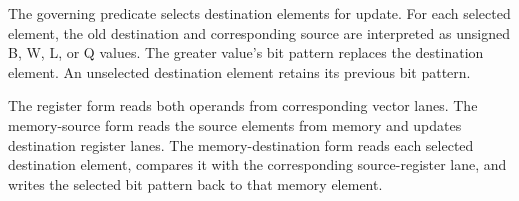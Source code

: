 The governing predicate selects destination elements for update. For each
selected element, the old destination and corresponding source are interpreted
as unsigned B, W, L, or Q values. The greater value's bit pattern replaces the
destination element. An unselected destination element retains its previous bit
pattern.

The register form reads both operands from corresponding vector lanes. The
memory-source form reads the source elements from memory and updates destination
register lanes. The memory-destination form reads each selected destination
element, compares it with the corresponding source-register lane, and writes
the selected bit pattern back to that memory element.

